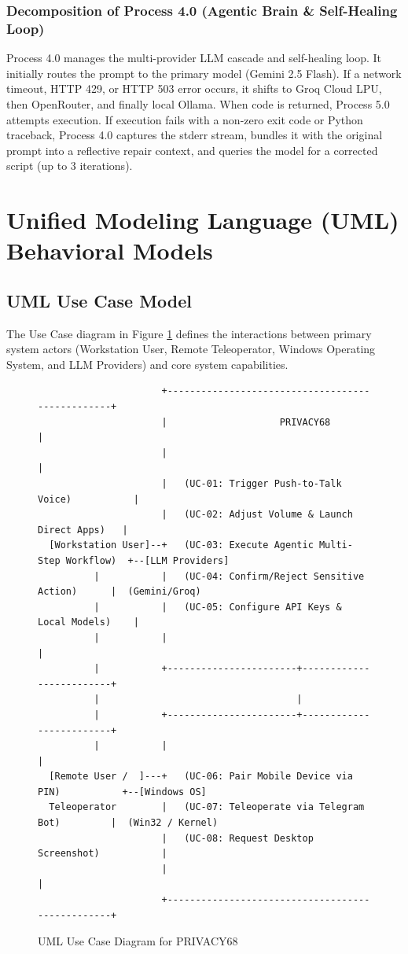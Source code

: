 \subsubsection{Decomposition of Process 4.0 (Agentic Brain \& Self-Healing Loop)}
Process 4.0 manages the multi-provider LLM cascade and self-healing loop. It initially routes the prompt to the primary model (Gemini 2.5 Flash). If a network timeout, HTTP 429, or HTTP 503 error occurs, it shifts to Groq Cloud LPU, then OpenRouter, and finally local Ollama. When code is returned, Process 5.0 attempts execution. If execution fails with a non-zero exit code or Python traceback, Process 4.0 captures the stderr stream, bundles it with the original prompt into a reflective repair context, and queries the model for a corrected script (up to 3 iterations).

\section{Unified Modeling Language (UML) Behavioral Models}

\subsection{UML Use Case Model}
The Use Case diagram in Figure \ref{fig:uml_use_case} defines the interactions between primary system actors (Workstation User, Remote Teleoperator, Windows Operating System, and LLM Providers) and core system capabilities.

\begin{figure}[htbp]
\centering
{\scriptsize
\begin{verbatim}
                      +-------------------------------------------------+
                      |                    PRIVACY68                    |
                      |                                                 |
                      |   (UC-01: Trigger Push-to-Talk Voice)           |
                      |   (UC-02: Adjust Volume & Launch Direct Apps)   |
  [Workstation User]--+   (UC-03: Execute Agentic Multi-Step Workflow)  +--[LLM Providers]
          |           |   (UC-04: Confirm/Reject Sensitive Action)      |  (Gemini/Groq)
          |           |   (UC-05: Configure API Keys & Local Models)    |
          |           |                                                 |
          |           +-----------------------+-------------------------+
          |                                   |
          |           +-----------------------+-------------------------+
          |           |                                                 |
  [Remote User /  ]---+   (UC-06: Pair Mobile Device via PIN)           +--[Windows OS]
  Teleoperator        |   (UC-07: Teleoperate via Telegram Bot)         |  (Win32 / Kernel)
                      |   (UC-08: Request Desktop Screenshot)           |
                      |                                                 |
                      +-------------------------------------------------+
\end{verbatim}
}
\caption{UML Use Case Diagram for PRIVACY68}
\label{fig:uml_use_case}
\end{figure}


